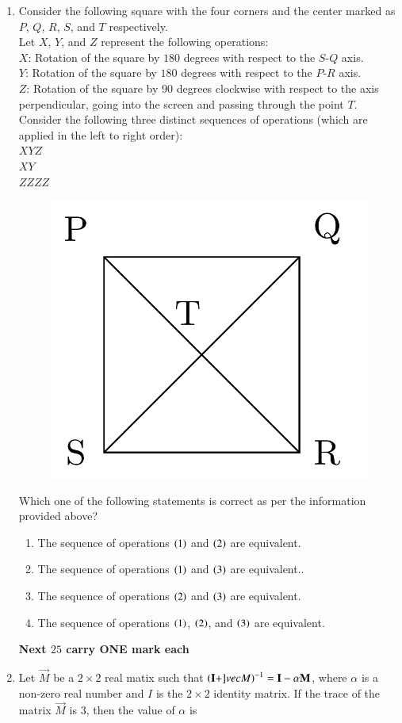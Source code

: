 \documentclass[journal]{IEEEtran}
\begin{document}
\begin{enumerate}
	\item Consider the following square with the four corners and the center marked as $P$, $Q$, $R$, $S$, and $T$ respectively.\\
    Let $X$, $Y$, and $Z$ represent the following operations:\\
    $X$: Rotation of the square by $180$ degrees with respect to the $S$-$Q$ axis.\\
    $Y$: Rotation of the square by $180$ degrees with respect to the $P$-$R$ axis.\\
    $Z$: Rotation of the square by $90$ degrees clockwise with respect to the axis perpendicular, going into the screen and passing through the point $T$.\\
    Consider the following three distinct sequences of operations (which are applied in the left to right order):\\
     $XYZ$\\
     $XY$\\
     $ZZZZ$\\
    \begin{figure}[ht!]
	    \centering
	    \includegraphics[width=0.3\linewidth]{fig/fig3.pdf}
	\end{figure}    Which one of the following statements is correct as per the information provided above?
    \begin{enumerate}
          \item The sequence of operations $\left(1\right)$ and $\left(2\right)$ are equivalent.
          \item The sequence of operations $\left(1\right)$ and $\left(3\right)$ are equivalent..
          \item The sequence of operations $\left(2\right)$ and $\left(3\right)$ are equivalent.
          \item The sequence of operations $\left(1\right)$, $\left(2\right)$, and $\left(3\right) $ are equivalent.
    \end{enumerate}
    \textbf{Next $25$ carry ONE mark each}
    \item Let $\vec{M} $ be a $2\times 2$ real matix such that $\left(\mathbf{I}+]vec{M}\right)^{-1}=\mathbf{I}-\alpha \mathbf{M}$, where $\alpha $ is a non-zero real number and $I$ is the $2\times 2$ identity matrix. If the trace of the matrix $\vec{M}$ is $3$, then the value of $\alpha$ is 

\end{enumerate}
\end{document}
